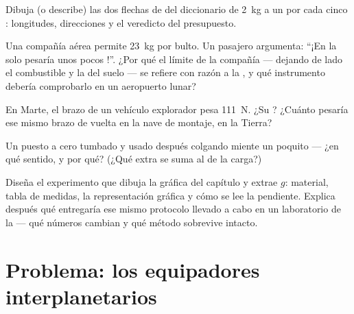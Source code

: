 \begin{exercise}[$\star$]\label{exo:g9:weight-vs-mass:8}
Dibuja (o describe) las dos flechas de  del diccionario de
\qty{2}{kg} a un  por cada cinco :
longitudes, direcciones y el veredicto del presupuesto.
\end{exercise}

\begin{exercise}[$\star\star$]\label{exo:g9:weight-vs-mass:9}
Una compañía aérea permite \qty{23}{kg} por bulto. Un pasajero
argumenta: ``¡En la  solo pesaría unos pocos
!''. ¿Por qué el límite de la compañía --- dejando de
lado el combustible y la  del suelo --- se refiere con razón
a la , y qué instrumento debería comprobarlo en un
aeropuerto lunar?
\end{exercise}

\begin{exercise}[$\star\star$]\label{exo:g9:weight-vs-mass:10}
En Marte, el brazo de un vehículo explorador pesa \qty{111}{N}. ¿Su
? ¿Cuánto pesaría ese mismo brazo de vuelta en la nave de
montaje, en la Tierra?
\end{exercise}

\begin{exercise}[$\star\star$]\label{exo:g9:weight-vs-mass:11}
Un  puesto a cero tumbado y usado después colgando
miente un poquito --- ¿en qué sentido, y por qué? (¿Qué
 extra se suma al de la carga?)
\end{exercise}

\begin{exercise}[$\star\star\star$]\label{exo:g9:weight-vs-mass:12}
Diseña el experimento que dibuja la gráfica del capítulo y extrae $g$:
material, tabla de medidas, la representación gráfica y cómo se lee la
pendiente. Explica después qué entregaría ese mismo protocolo llevado a
cabo en un laboratorio de la  --- qué números cambian y qué
método sobrevive intacto.
\end{exercise}

\section{Problema: los equipadores interplanetarios}


